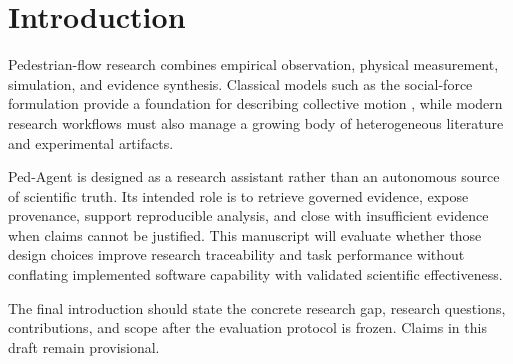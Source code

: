 \section{Introduction}

Pedestrian-flow research combines empirical observation, physical measurement, simulation, and evidence synthesis. Classical models such as the social-force formulation provide a foundation for describing collective motion \cite{helbing1995social}, while modern research workflows must also manage a growing body of heterogeneous literature and experimental artifacts.

Ped-Agent is designed as a research assistant rather than an autonomous source of scientific truth. Its intended role is to retrieve governed evidence, expose provenance, support reproducible analysis, and close with insufficient evidence when claims cannot be justified. This manuscript will evaluate whether those design choices improve research traceability and task performance without conflating implemented software capability with validated scientific effectiveness.

The final introduction should state the concrete research gap, research questions, contributions, and scope after the evaluation protocol is frozen. Claims in this draft remain provisional.
